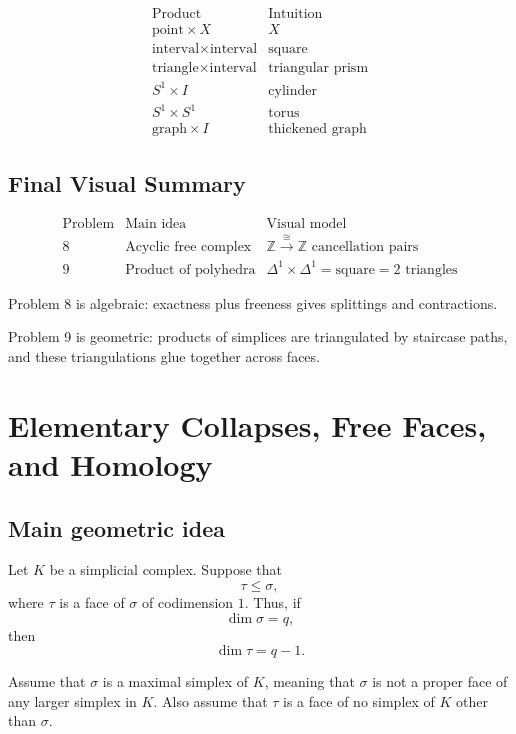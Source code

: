 \documentclass[12pt,a4paper]{article}
\theoremstyle{notespace}
\begin{document}
\[
\begin{array}{c|c}
	\text{Product} & \text{Intuition} \\
	\hline
	\text{point}\times X & X \\
	\hline
	\text{interval}\times\text{interval} & \text{square} \\
	\hline
	\text{triangle}\times\text{interval} & \text{triangular prism} \\
	\hline
	S^1\times I & \text{cylinder} \\
	\hline
	S^1\times S^1 & \text{torus} \\
	\hline
	\text{graph}\times I & \text{thickened graph}
\end{array}
\]

\subsection{Final Visual Summary}

\[
\begin{array}{c|c|c}
	\text{Problem} & \text{Main idea} & \text{Visual model} \\
	\hline
	8
	&
	\text{Acyclic free complex}
	&
	\mathbb Z\xrightarrow{\cong}\mathbb Z
	\text{ cancellation pairs}
	\\
	\hline
	9
	&
	\text{Product of polyhedra}
	&
	\Delta^1\times\Delta^1
	=
	\text{square}
	=
	2\text{ triangles}
\end{array}
\]

Problem 8 is algebraic: exactness plus freeness gives splittings and contractions.

Problem 9 is geometric: products of simplices are triangulated by staircase paths, and these triangulations glue together across faces.

\section{Elementary Collapses, Free Faces, and Homology}

\subsection{Main geometric idea}

Let \(K\) be a simplicial complex. Suppose that
\[
\tau \leq \sigma,
\]
where \(\tau\) is a face of \(\sigma\) of codimension \(1\). Thus, if
\[
\dim \sigma=q,
\]
then
\[
\dim \tau=q-1.
\]

Assume that \(\sigma\) is a maximal simplex of \(K\), meaning that \(\sigma\) is not a proper face of any larger simplex in \(K\). Also assume that \(\tau\) is a face of no simplex of \(K\) other than \(\sigma\).
\end{document}
